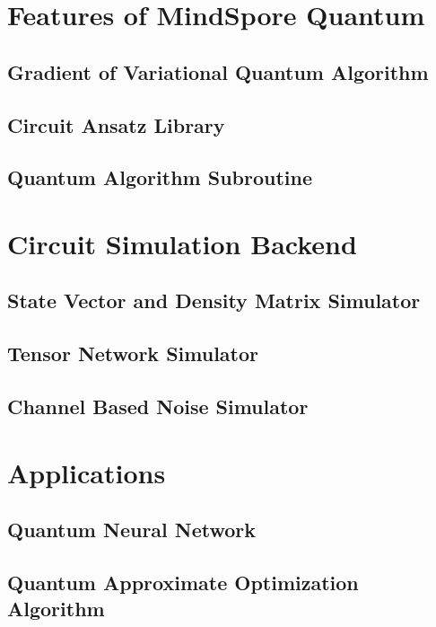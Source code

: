 \documentclass[pra,twocolumn,superscriptaddress,floatfix,nofootinbib,amsmath,amssymb]{revtex4-1}
\begin{document}
\section{Features of MindSpore Quantum}


\subsection{Gradient of Variational Quantum Algorithm}


\subsection{Circuit Ansatz Library}


\subsection{Quantum Algorithm Subroutine}



\section{Circuit Simulation Backend}


\subsection{State Vector and Density Matrix Simulator}


\subsection{Tensor Network Simulator}


\subsection{Channel Based Noise Simulator}



\section{Applications}


\subsection{Quantum Neural Network}


\subsection{Quantum Approximate Optimization Algorithm}

\end{document}
